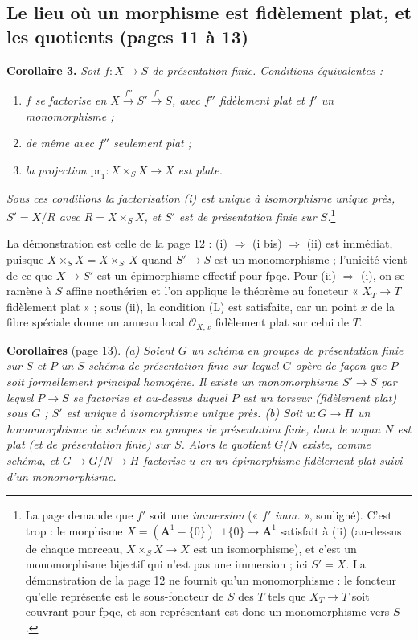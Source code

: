 \documentclass[11pt,a4paper]{article}
\begin{document}
\subsection*{Le lieu où un morphisme est fidèlement plat, et les quotients (pages 11 à 13)}

\textbf{Corollaire 3.} \emph{Soit $f : X \to S$ de présentation finie.
Conditions équivalentes :}
\begin{enumerate}
  \item[(i)] \emph{$f$ se factorise en $X \xrightarrow{f''} S' \xrightarrow{f'} S$,
  avec $f''$ fidèlement plat et $f'$ un monomorphisme ;}
  \item[(i bis)] \emph{de même avec $f''$ seulement plat ;}
  \item[(ii)] \emph{la projection $\mathrm{pr}_1 : X \times_S X \to X$ est plate.}
\end{enumerate}
\emph{Sous ces conditions la factorisation (i) est unique à isomorphisme unique
près, $S' = X/R$ avec $R = X \times_S X$, et $S'$ est de présentation finie sur
$S$.}\footnote{La page demande que $f'$ soit une \emph{immersion} (« $f'$
\emph{imm.} », souligné). C'est trop : le morphisme $X = (\mathbf{A}^1 - \{0\})
\sqcup \{0\} \to \mathbf{A}^1$ satisfait à (ii) (au-dessus de chaque morceau,
$X \times_S X \to X$ est un isomorphisme), et c'est un monomorphisme
bijectif qui n'est pas une immersion ; ici $S' = X$. La démonstration de la
page 12 ne fournit qu'un monomorphisme : le foncteur qu'elle
représente est le sous-foncteur de $S$ des $T$ tels que $X_T \to T$ soit
couvrant pour fpqc, et son représentant est donc un monomorphisme vers $S$.}

La démonstration est celle de la page 12 : (i) $\Rightarrow$ (i bis)
$\Rightarrow$ (ii) est immédiat, puisque $X \times_S X = X \times_{S'} X$ quand
$S' \to S$ est un monomorphisme ; l'unicité vient de ce que $X \to S'$ est un
épimorphisme effectif pour fpqc. Pour (ii) $\Rightarrow$ (i), on se ramène à
$S$ affine noethérien et l'on applique le théorème au foncteur « $X_T \to T$
fidèlement plat » ; sous (ii), la condition (L) est satisfaite, car un point
$x$ de la fibre spéciale donne un anneau local $\mathcal{O}_{X,x}$ fidèlement
plat sur celui de $T$.

\textbf{Corollaires} (page 13). \emph{(a) Soient $G$ un schéma en groupes de
présentation finie sur $S$ et $P$ un $S$-schéma de présentation finie sur
lequel $G$ opère de façon que $P$ soit formellement principal homogène. Il
existe un monomorphisme $S' \to S$ par lequel $P \to S$ se factorise et au-dessus
duquel $P$ est un torseur (fidèlement plat) sous $G$ ; $S'$ est unique à
isomorphisme unique près. (b) Soit $u : G \to H$ un homomorphisme de schémas
en groupes de présentation finie, dont le noyau $N$ est plat (et de présentation
finie) sur $S$. Alors le quotient $G/N$ existe, comme schéma, et $G \to G/N
\to H$ factorise $u$ en un épimorphisme fidèlement plat suivi d'un
monomorphisme.}
\end{document}

